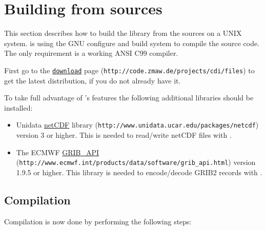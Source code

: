 \section{\label{build}Building from sources}

This section describes how to build the {\CDI} library from the sources on a UNIX system.
{\CDI} is using the GNU configure and build system to compile the source code.
The only requirement is a working ANSI C99 compiler.

First go to the \href{http://code.zmaw.de/projects/cdi/files}{\tt download} page
({\tt http://code.zmaw.de/projects/cdi/files}) to get the latest distribution,
if you do not already have it.

To take full advantage of {\CDI}'s features the following additional libraries should be installed:

\begin{itemize}
\item Unidata \href{http://www.unidata.ucar.edu/packages/netcdf}{netCDF} library
      ({\tt http://www.unidata.ucar.edu/packages/netcdf})
      version 3 or higher.
      This is needed to read/write netCDF files with {\CDI}. 
\item The ECMWF \href{http://www.ecmwf.int/products/data/software/grib_api.html}{GRIB\_API}
      ({\tt http://www.ecmwf.int/products/data/software/grib\_api.html})
      version 1.9.5 or higher.
      This library is needed to encode/decode GRIB2 records with {\CDI}. 
\end{itemize}


\subsection{Compilation}

Compilation is now done by performing the following steps:

